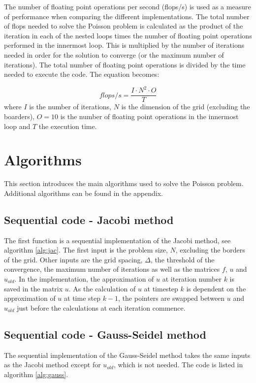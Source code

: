 The number of floating point operations per second (flops/s) is used as a measure of performance when comparing the different implementations. The total number of flops needed to solve the Poisson problem is calculated as the product of the iteration in each of the nested loops times the number of floating point operations performed in the innermost loop. 
This is multiplied by the number of iterations needed in order for the solution to converge (or the maximum number of iterations).
The total number of floating point operations is divided by the time needed to execute the code. The equation becomes:

\begin{equation}
flops/s =  \frac{I \cdot N^2 \cdot O}{T}
\label{eq:flops_time}
\end{equation}
where $I$ is the number of iterations, $N$ is the dimension of the grid (excluding the boarders), $O=10$ is the number of floating point operations in the innermost loop and $T$ the execution time.


\section{Algorithms}
This section introduces the main algorithms used to solve the Poisson problem. Additional algorithms can be found in the appendix. 


\subsection{Sequential code - Jacobi method}
The first function is a sequential implementation of the Jacobi method, see algorithm \ref{alg:jac}. The first input is the problem size, $N$, excluding the borders of the grid. Other inputs are the grid spacing, $\Delta$, the threshold of the convergence, the maximum number of iterations as well as the matrices $f$, $u$ and $u_{old}$. In the implementation, the approximation of $u$ at iteration number $k$ is saved in the matrix $u$. As the calculation of $u$ at timestep $k$ is dependent on the approximation of $u$ at time step $k-1$, the pointers are swapped between $u$ and $u_{old}$ just before the calculations at each iteration commence.




\subsection{Sequential code - Gauss-Seidel method}
The sequential implementation of the Gauss-Seidel method takes the same inputs as the Jacobi method except for $u_{old}$, which is not needed. The code is listed in algorithm \ref{alg:gauss}. 


